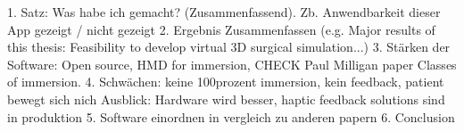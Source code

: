 1. Satz: Was habe ich gemacht? (Zusammenfassend). Zb. Anwendbarkeit dieser App gezeigt / nicht gezeigt
2. Ergebnis Zusammenfassen (e.g. Major results of this thesis: Feasibility to develop virtual 3D surgical simulation...)
3. Stärken der Software: Open source, HMD for immersion, CHECK Paul Milligan paper Classes of immersion.
4. Schwächen: keine 100prozent immersion, kein feedback, patient bewegt sich nich
            Ausblick: Hardware wird besser, haptic feedback solutions sind in produktion
5. Software einordnen in vergleich zu anderen papern
6. Conclusion
 
